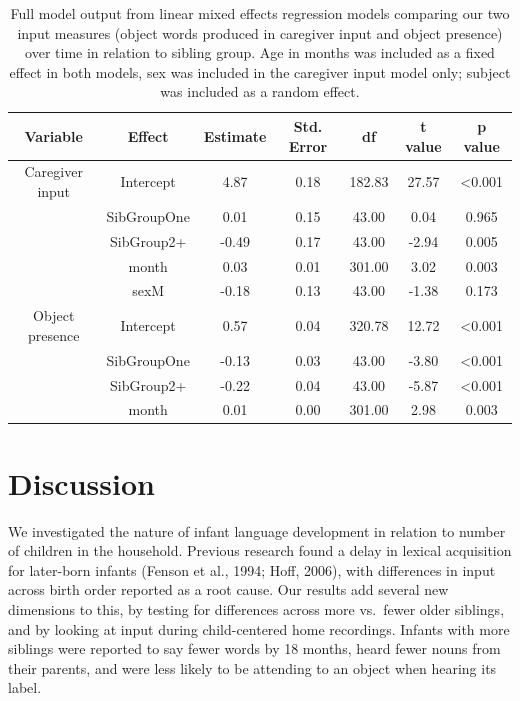 \documentclass[
  man,mask,floatsintext]{apa6}
\begin{document}
\begin{longtable}[t]{ccccccc}
\caption{\label{tab:table-input-model-summary}Full model output from linear mixed effects regression models comparing our two input measures (object words produced in caregiver input and object presence) over time in relation to sibling group. Age in months was included as a fixed effect in both models, sex was included in the caregiver input model only; subject was included as a random effect.}\\
\toprule
Variable & Effect & Estimate & Std. Error & df & t value & p value\\
\midrule
Caregiver input & Intercept & 4.87 & 0.18 & 182.83 & 27.57 & <0.001\\
 & SibGroupOne & 0.01 & 0.15 & 43.00 & 0.04 & 0.965\\
 & SibGroup2+ & -0.49 & 0.17 & 43.00 & -2.94 & 0.005\\
 & month & 0.03 & 0.01 & 301.00 & 3.02 & 0.003\\
 & sexM & -0.18 & 0.13 & 43.00 & -1.38 & 0.173\\
\midrule
\addlinespace
Object presence & Intercept & 0.57 & 0.04 & 320.78 & 12.72 & <0.001\\
 & SibGroupOne & -0.13 & 0.03 & 43.00 & -3.80 & <0.001\\
 & SibGroup2+ & -0.22 & 0.04 & 43.00 & -5.87 & <0.001\\
 & month & 0.01 & 0.00 & 301.00 & 2.98 & 0.003\\
\bottomrule
\end{longtable}

\hypertarget{discussion}{%
\section{Discussion}\label{discussion}}

We investigated the nature of infant language development in relation to number of children in the household. Previous research found a delay in lexical acquisition for later-born infants (Fenson et al., 1994; Hoff, 2006), with differences in input across birth order reported as a root cause. Our results add several new dimensions to this, by testing for differences across more vs.~fewer older siblings, and by looking at input during child-centered home recordings. Infants with more siblings were reported to say fewer words by 18 months, heard fewer nouns from their parents, and were less likely to be attending to an object when hearing its label.
\end{document}

